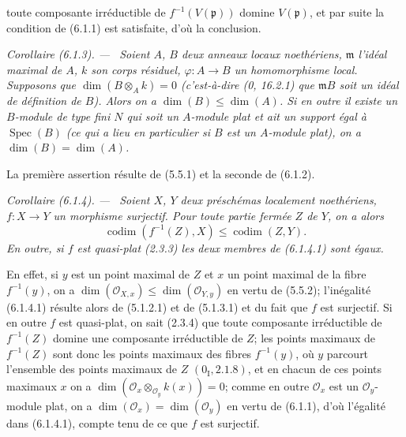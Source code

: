 \documentclass[10pt,oneside]{book}
\makeatletter
\newcommand{\oldpage}[2][]{%
  \setcounter{footnote}{0}%
  \marginpar{\scriptsize\textbf{#1}~|~#2}\ignorespaces}
\newenvironment{corollary}[1][]{%
  \par\medskip\noindent\itshape Corollaire (#1). ---\ }{\par}
\newcommand{\EGAReaderTarget}[2]{\hypertarget{#1}{}\@bsphack\begingroup\def\@currentHref{#1}\label{#2}\endgroup\@esphack}
\makeatother
\begin{document}
\oldpage[IV-2]{136}

toute composante irréductible de $f^{-1}(V(\mathfrak p))$ domine
$V(\mathfrak p)$, et par suite la condition de (6.1.1) est satisfaite, d'où la
conclusion.

\begin{corollary}[6.1.3]
\EGAReaderTarget{ega4.c04.cor.6-1-3}{IV.2.s6.1.3-fr}
Soient $A$, $B$ deux anneaux locaux noethériens, $\mathfrak m$ l'idéal maximal
de $A$, $k$ son corps résiduel, $\varphi:A\to B$ un homomorphisme local.
Supposons que $\dim(B\otimes_Ak)=0$ (c'est-à-dire (0, 16.2.1) que
$\mathfrak mB$ soit un idéal de définition de $B$). Alors on a
$\dim(B)\leq\dim(A)$. Si en outre il existe un $B$-module de type fini $N$ qui
soit un $A$-module plat et ait un support égal à $\operatorname{Spec}(B)$
(ce qui a lieu en particulier si $B$ est un $A$-module plat), on a
$\dim(B)=\dim(A)$.
\end{corollary}

La première assertion résulte de (5.5.1) et la seconde de (6.1.2).

\begin{corollary}[6.1.4]
\label{IV.2.s6.1.4-fr}
Soient $X$, $Y$ deux préschémas localement noethériens, $f:X\to Y$ un
morphisme surjectif. Pour toute partie fermée $Z$ de $Y$, on a alors
\begin{equation}
\operatorname{codim}(f^{-1}(Z),X)\leq\operatorname{codim}(Z,Y).
\tag{6.1.4.1}\label{IV.2.s6.1.4.1-fr}
\end{equation}
En outre, si $f$ est quasi-plat (2.3.3) les deux membres de (6.1.4.1) sont
égaux.
\end{corollary}

En effet, si $y$ est un point maximal de $Z$ et $x$ un point maximal de la
fibre $f^{-1}(y)$, on a
$\dim(\mathcal O_{X,x})\leq\dim(\mathcal O_{Y,y})$ en vertu de (5.5.2);
l'inégalité (6.1.4.1) résulte alors de (5.1.2.1) et de (5.1.3.1) et du fait
que $f$ est surjectif. Si en outre $f$ est quasi-plat, on sait (2.3.4) que
toute composante irréductible de $f^{-1}(Z)$ domine une composante
irréductible de $Z$; les points maximaux de $f^{-1}(Z)$ sont donc les points
maximaux des fibres $f^{-1}(y)$, où $y$ parcourt l'ensemble des points maximaux
de $Z$ $(0_{\mathrm I}, 2.1.8)$, et en chacun de ces points maximaux $x$ on a
$\dim(\mathcal O_x\otimes_{\mathcal O_y}k(x))=0$; comme en outre
$\mathcal O_x$ est un $\mathcal O_y$-module plat, on a
$\dim(\mathcal O_x)=\dim(\mathcal O_y)$ en vertu de (6.1.1), d'où l'égalité
dans (6.1.4.1), compte tenu de ce que $f$ est surjectif.
\end{document}

